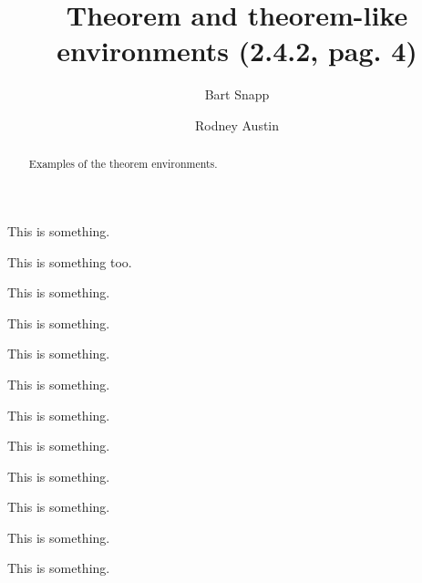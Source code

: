 \documentclass{ximera}
\author{Bart Snapp \and Rodney Austin}
\title[Examples:]{Theorem and theorem-like environments (2.4.2, pag. 4)}
\begin{document}
\begin{abstract}
  Examples of the theorem environments.
\end{abstract}
\maketitle



\begin{theorem}
  This is something.
\end{theorem}

\begin{theorem}[My theorem]
  This is something too.
\end{theorem}

\begin{algorithm}
  This is something.
\end{algorithm}

\begin{axiom}
  This is something.
\end{axiom}

\begin{claim}
  This is something.
\end{claim}

\begin{conclusion}
  This is something.
\end{conclusion}

\begin{condition}
  This is something.
\end{condition}

\begin{conjecture}
  This is something.
\end{conjecture}

\begin{corollary}
  This is something.
\end{corollary}

\begin{criterion}
  This is something.
\end{criterion}

\begin{definition}
  This is something.
\end{definition}

\begin{example}
  This is something.
\end{example}
\end{document}
